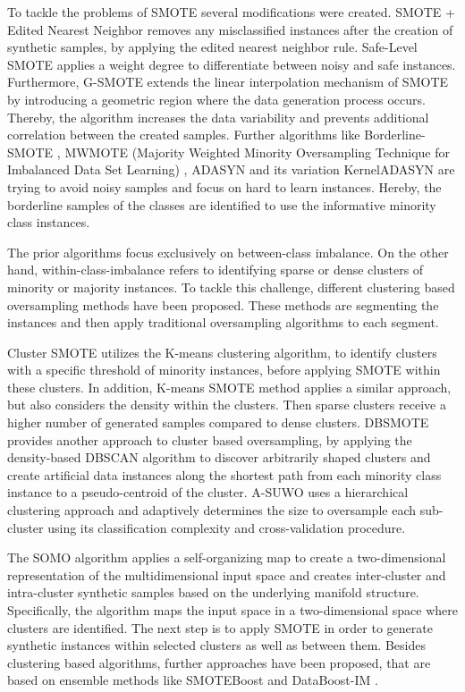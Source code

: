 \documentclass[parskip=full]{scrartcl}
\begin{document}
To tackle the problems of SMOTE several modifications were created. SMOTE + Edited Nearest Neighbor \cite{Batista2004} removes any misclassified instances after the creation of synthetic samples, by applying the edited nearest neighbor rule. Safe-Level SMOTE \cite{Bunkhumpornpat2009} applies a weight degree to differentiate between noisy and safe instances. Furthermore, G-SMOTE \cite{Douzas2019} extends the linear interpolation mechanism of SMOTE by introducing a geometric region where the data generation process occurs. Thereby, the algorithm increases the data variability and prevents additional correlation between the created samples. Further algorithms like Borderline-SMOTE \cite{Han2005}, MWMOTE (Majority Weighted Minority Oversampling Technique for Imbalanced Data Set Learning) \cite{Barua2014}, ADASYN and its variation KernelADASYN \cite{Tang2015} are trying to avoid noisy samples and focus on hard to learn instances. Hereby, the borderline samples of the classes are identified to use the informative minority class instances.

The prior algorithms focus exclusively on between-class imbalance. On the other hand, within-class-imbalance refers to identifying sparse or dense clusters of minority or majority instances. To tackle this challenge, different clustering based oversampling methods have been proposed. These methods are segmenting the instances and then apply traditional oversampling algorithms to each segment.

Cluster SMOTE \cite{Cieslak2006} utilizes the K-means clustering algorithm, to identify clusters with a specific threshold of minority instances, before applying SMOTE within these clusters. In addition, K-means SMOTE \cite{Douzas2018} method applies a similar approach, but also considers the density within the clusters. Then sparse clusters receive a higher number of generated samples compared to dense clusters. DBSMOTE \cite{Bunkhumpornpat2012} provides another approach to cluster based oversampling, by applying the density-based DBSCAN algorithm to discover arbitrarily shaped clusters and create artificial data instances along the shortest path from each minority class instance to a pseudo-centroid of the cluster. A-SUWO \cite{Nekooeimehr2016} uses a hierarchical clustering approach and adaptively determines the size to oversample each sub-cluster using its classification complexity and cross-validation procedure.

The SOMO algorithm \cite{Douzas2017} applies a self-organizing map to create a two-dimensional representation of the multidimensional input space and creates inter-cluster and intra-cluster synthetic samples based on the underlying manifold structure. Specifically, the algorithm maps the input space in a two-dimensional space where clusters are identified. The next step is to apply SMOTE in order to generate synthetic instances within selected clusters as well as between them. Besides clustering based algorithms, further approaches have been proposed, that are based on ensemble methods like SMOTEBoost \cite{Chawla2003} and DataBoost-IM \cite{Guo2004}.
\end{document}
